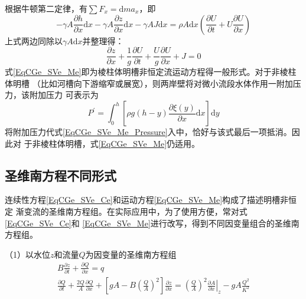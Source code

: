根据牛顿第二定律，有$\sum F_{x}=\mathrm{d}ma_{x}$，即
\begin{equation}
  -\gamma A\frac{\partial h}{\partial x}\mathrm{d}x
  -\gamma A\frac{\partial z}{\partial x}\mathrm{d}x
  -\gamma AJ\mathrm{d}x
  =
  \rho A\mathrm{d}x
  \left(
  \frac{\partial U}{\partial t}
  +
  U
  \frac{\partial U}{\partial x}
  \right)
\end{equation}
上式两边同除以$\gamma A\mathrm{d}x$并整理得：
\begin{equation}
  \frac{\partial z}{\partial x}
  +
  \frac{1}{g}
  \frac{\partial U}{\partial t}
  +
  \frac{U}{g}
  \frac{\partial U}{\partial x}
  +
  J
  =
  0
  \label{EqCGe_SVe_Me}
\end{equation}
式\eqref{EqCGe_SVe_Me}即为棱柱体明槽非恒定流运动方程得一般形式。对于非棱柱体明槽
（比如河槽向下游缩窄或展宽），则两岸壁将对微小流段水体作用一附加压力，该附加压力
可表示为
\begin{equation}
  P^{\prime}
  =
  \int_{0}^{h}\!
  \left[
    \rho g(h-y)
    \frac{\partial \xi(y)}{\partial x}
    \mathrm{d}x
  \right]
  \mathrm{d}y
\end{equation}
将附加压力代式\eqref{EqCGe_SVe_Me_Pressure}入中，恰好与该式最后一项抵消。因此对
于非棱柱体明槽，式\eqref{EqCGe_SVe_Me}仍适用。

\subsection{圣维南方程不同形式}
连续性方程\eqref{EqCGe_SVe_Ce}和运动方程\eqref{EqCGe_SVe_Me}构成了描述明槽非恒定
渐变流的圣维南方程组。在实际应用中，为了使用方便，常对式\eqref{EqCGe_SVe_Ce}和
\eqref{EqCGe_SVe_Me}进行改写，得到不同因变量组合的圣维南方程组。


（1）以水位$z$和流量$Q$为因变量的圣维南方程组
\begin{equation}
  \begin{gathered}
    B\frac{\partial z}{\partial t}
    +
    \frac{\partial Q}{\partial x}
    =
    q
    \\
    \frac{\partial Q}{\partial t}
    +
    \frac{2Q}{A}\frac{\partial Q}{\partial x}
    +
    \left[
      gA -
      B
      \left(
      \frac{Q}{A}
      \right)^{2}
    \right]
    \frac{\partial z}{\partial x}
    =
    \left(
    \frac{Q}{A}
    \right)^{2}
    \left.
    \frac{\partial A}{\partial x}
    \right|_{z}
    -
    gA\frac{Q^{2}}{K^{2}}
  \end{gathered}
  \label{EqCGe_SV_zQ}
\end{equation}

